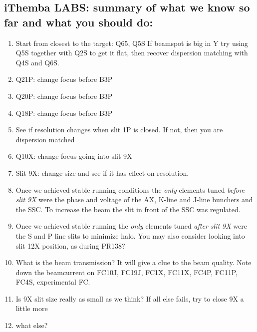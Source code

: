 \documentclass[11pt]{report}
\begin{document}
  

\subsection{iThemba LABS: summary of what we know so far and what you should do:}
\begin{enumerate}
\item Start from closest to the target: Q65, Q5S
If beamspot is big in Y try using Q5S together with Q2S to get it flat, then
recover dispersion matching with Q4S and Q6S.
\item Q21P: change focus before B3P
\item Q20P: change focus before B3P
\item Q18P: change focus before B3P
\item See if resolution changes when slit 1P is closed. If not, then you are dispersion matched
\item Q10X: change focus going into slit 9X
\item Slit 9X: change size and see if it has effect on resolution.
\item Once we achieved stable running conditions the {\it only} elements tuned 
{\it before slit 9X} were the phase and voltage of the AX, K-line and J-line bunchers and the SSC. 
To increase the beam the slit in front of the SSC was regulated.
\item Once we achieved stable running the {\it only} elements tuned 
{\it after slit 9X} were the S and P line slits to minimize halo.
You may also consider looking into slit 12X position, as during PR138?
\item What is the beam transmission? It will give a clue to the beam quality. 
Note down the beamcurrent on FC10J, FC19J, FC1X, FC11X, FC4P, FC11P, FC4S, experimental FC.
\item Is 9X slit size really as small as we think? If all else fails, try to close 9X a little more
\item what else?
\end{enumerate}
\end{document}
